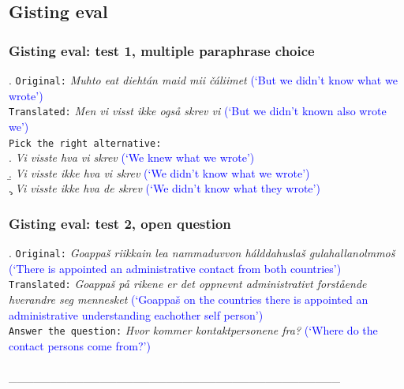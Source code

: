 \documentclass[notes=hide]{beamer}
\begin{document}
\subsection{Gisting eval}
\begin{frame}\frametitle{Gisting eval: test 1, multiple paraphrase choice}
  \ex.
  \texttt{Original:} \textit{Muhto eat diehtán maid mii čáliimet} \textcolor{blue}{(`But we didn't know what we wrote')}\\
  \texttt{Translated:} \textit{Men vi visst ikke også skrev vi} \textcolor{blue}{(`But we didn't known also wrote we')}\\
  \texttt{Pick the right alternative:}\\
  \a. \textit{Vi visste hva vi skrev} \textcolor{blue}{(`We knew what we wrote')}\\
  \b. \textit{Vi visste ikke hva vi skrev} \textcolor{blue}{(`We didn't know what we wrote')}\\
  \c. \textit{Vi visste ikke hva de skrev} \textcolor{blue}{(`We didn't know what they wrote')}

\end{frame}

\begin{frame}\frametitle{Gisting eval: test 2, open question}
  \ex.
  \small
  \texttt{Original:} \textit{Goappaš riikkain lea nammaduvvon hálddahuslaš gulahallanolmmoš} \textcolor{blue}{(`There is appointed an administrative contact from both countries')}\\
  \texttt{Translated:} \textit{Goappaš på rikene er det oppnevnt administrativt forstående hverandre seg mennesket} \textcolor{blue}{(`Goappaš on the countries there is appointed an administrative understanding eachother self person')}\\
  \texttt{Answer the question:} \textit{Hvor kommer kontaktpersonene fra?} \textcolor{blue}{(`Where do the contact persons come from?')}\\~\\
  \_\_\_\_\_\_\_\_\_\_\_\_\_\_\_\_\_\_\_\_\_\_\_\_\_\_\_\_\_\_\_\_\_\_\_\_\_\_\_\_

\end{frame}
\end{document}
